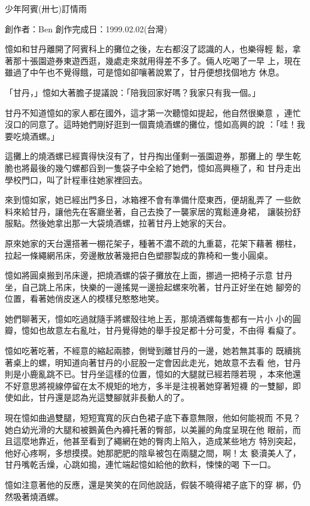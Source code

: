 



少年阿賓(卅七)訂情雨

創作者：Ben
創作完成日：1999.02.02(台灣)


憶如和甘丹離開了阿賓科上的攤位之後，左右都沒了認識的人，也樂得輕
鬆，拿著那十張園遊券東遊西逛，幾處走來就用得差不多了。倆人吃喝了一早
上，現在雖過了中午也不覺得餓，可是憶如卻嚷著說累了，甘丹便想找個地方
休息。

「甘丹，」憶如大著膽子提議說：「陪我回家好嗎？我家只有我一個。」

甘丹不知道憶如的家人都在國外，這才第一次聽憶如提起，他自然很樂意
，連忙沒口的同意了。這時她們剛好逛到一個賣燒酒螺的攤位，憶如高興的說
：「哇！我要吃燒酒螺。」

這攤上的燒酒螺已經賣得快沒有了，甘丹掏出僅剩一張園遊券，那攤上的
學生乾脆也將最後的幾勺螺都舀到一隻袋子中全給了她們，憶如高興極了，和
甘丹走出學校門口，叫了計程車往她家裡回去。

來到憶如家，她已經出門多日，冰箱裡不會有準備什麼東西，便胡亂弄了
一些飲料來給甘丹，讓他先在客廳坐著，自己去換了一襲家居的寬鬆連身裙，
讓裝扮舒服點。然後她拿出那一大袋燒酒螺，拉著甘丹上她家的天台。

原來她家的天台還搭著一棚花架子，種著不濃不疏的九重葛，花架下藉著
棚柱，拉起一條繩網吊床，旁邊散放著幾把白色塑膠製成的靠椅和一隻小圓桌。

憶如將圓桌搬到吊床邊，把燒酒螺的袋子攤放在上面，挪過一把椅子示意
甘丹坐，自己跳上吊床，快樂的一邊搖晃一邊撿起螺來吮著，甘丹正好坐在她
腳旁的位置，看著她俏皮迷人的模樣兒憨憨地笑。

她們聊著天，憶如吃過就隨手將螺殼往地上丟，那燒酒螺每隻都有一片小
小的圓瓣，憶如也故意左右亂吐，甘丹覺得她的舉手投足都十分可愛，不由得
看癡了。

憶如吃著吃著，不經意的縮起兩膝，側彎到離甘丹的一邊，她若無其事的
既續挑著桌上的螺，明知道向著甘丹的小屁股一定會因此走光，她故意不去看
他，甘丹則是小鹿亂跳不已。甘丹坐這樣的位置，憶如的大腿就已經若隱若現
，本來他還不好意思將視線停留在太不規矩的地方，多半是注視著她穿著短襪
的一雙腳，即使如此，甘丹還是認為光這雙腳就非長動人的了。

現在憶如曲過雙腿，短短寬寬的灰白色裙子底下春意無限，他如何能視而
不見？她白幼光滑的大腿和被鵝黃色內褲托著的臀部，以美麗的角度呈現在他
眼前，而且這麼地靠近，他甚至看到了繩網在她的臀肉上陷入，造成某些地方
特別突起，他好心疼啊，多想摸摸。她那肥肥的陰阜被包在兩腿之間，啊！太
褻瀆美人了，甘丹嘴乾舌燥，心跳如搗，連忙端起憶如給他的飲料，悚悚的喝
下一口。

憶如注意著他的反應，還是笑笑的在同他說話，假裝不曉得裙子底下的穿
梆，仍然吸著燒酒螺。

